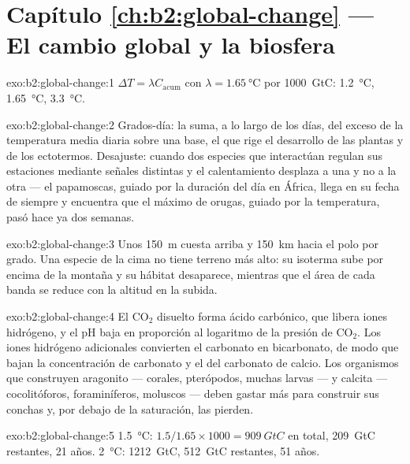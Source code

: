 \section*{Capítulo \ref{ch:b2:global-change} --- El cambio global y la biosfera}

\begin{solution}{exo:b2:global-change:1}
$\Delta T = \lambda C_{\text{acum}}$ con $\lambda = \qty{1.65}{\celsius}$
por \qty{1000}{GtC}: \qty{1.2}{\celsius}, \qty{1.65}{\celsius},
\qty{3.3}{\celsius}.
\end{solution}

\begin{solution}{exo:b2:global-change:2}
Grados-día: la suma, a lo largo de los días, del exceso de la temperatura
media diaria sobre una base, el  que rige el desarrollo de
las plantas y de los ectotermos. Desajuste: cuando dos especies que
interactúan regulan sus estaciones mediante señales distintas y el
calentamiento desplaza a una y no a la otra --- el papamoscas, guiado por
la duración del día en África, llega en su fecha de siempre y encuentra
que el máximo de orugas, guiado por la temperatura, pasó hace ya dos
semanas.
\end{solution}

\begin{solution}{exo:b2:global-change:3}
Unos \qty{150}{m} cuesta arriba y \qty{150}{km} hacia el polo por grado.
Una especie de la cima no tiene terreno más alto: su isoterma sube por
encima de la montaña y su hábitat desaparece, mientras que el área de cada
banda se reduce con la altitud en la subida.
\end{solution}

\begin{solution}{exo:b2:global-change:4}
El \ensuremath{\mathrm{CO_2}} disuelto forma ácido carbónico, que libera iones
hidrógeno, y el pH baja en proporción al logaritmo de la presión de
\ensuremath{\mathrm{CO_2}}. Los iones hidrógeno adicionales convierten el
carbonato en bicarbonato, de modo que bajan la concentración de carbonato
y el  del carbonato de calcio. Los organismos que
construyen aragonito --- corales, pterópodos, muchas larvas --- y calcita
--- cocolitóforos, foraminíferos, moluscos --- deben gastar más para
construir sus conchas y, por debajo de la saturación, las pierden.
\end{solution}

\begin{solution}{exo:b2:global-change:5}
\qty{1.5}{\celsius}: $1.5/1.65\times 1000 = \qty{909}{GtC}$ en total,
\qty{209}{GtC} restantes, 21 años. \qty{2}{\celsius}:
\qty{1212}{GtC}, \qty{512}{GtC} restantes, 51 años.
\end{solution}

